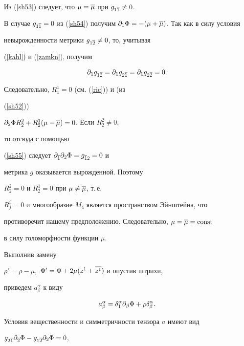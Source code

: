 Из (\ref{sh53}) следует, что $\mu=\overline\mu$ при $g_{1\overline 1} \neq 0$.


В случае $g_{1\ol 1} = 0$ из (\ref{sh54}) получим $\pl 1 \Phi


=-(\mu+\ol\mu)$. Так как в силу условия


невырожденности метрики $g_{1 \overline 2}\neq 0$, то, учитывая


(\ref{kahl}) и (\ref{zamkn}), получим


\begin{equation}


\label{sh55}


\pl 1 g_{1\ol 2}=\pl 1 g_{2\ol 1}=\pl 1 g_{2\ol 2}=0.


\end{equation}


Следовательно, $R^1_1=0$ (см. (\ref{ric})) и (из


(\ref{sh52}))


$\partial_ 2 \Phi R^2_2 +R^1_2 (\mu - \overline \mu)=0$. Если $R^2_2\neq 0$,


то отсюда с помощью


(\ref{sh55}) следует $\partial_ {\overline 1}\partial_ 2 \Phi = g_{\overline 12}=0$ и


метрика $g$ оказывается вырожденной. Поэтому


$R^2_2=0$ и $R^1_2=0$ при $\mu \neq \overline\mu$, т.\,е.


$R^i_j=0$ и многообразие $M_4$ является пространством Эйнштейна, что


противоречит нашему предположению. Следовательно, $\mu = \overline\mu =\operatorname{const}$


в силу голоморфности функции $\mu$.





Выполнив замену


$\rho'=\rho-\mu,$ $\Phi'=\Phi+2\mu(z^1 +\overline{z^1})$ и опустив штрихи,


приведем $a^\alpha_\beta$ к виду


\begin{equation}


\label{sh56}


a^\alpha_\beta = \delta_1^\alpha \pl\beta\Phi


+\rho\delta^\alpha_\beta.


\end{equation}


Условия вещественности и симметричности тензора $a$ имеют вид


$g_{2\overline 1}\partial_{\overline 2}\Phi - g_{1\overline 2}\partial_ 2 \Phi = 0$,


